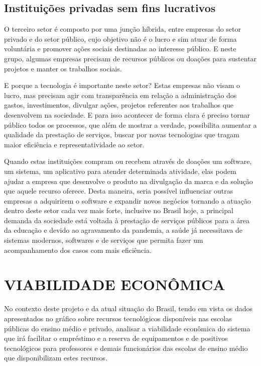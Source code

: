 \documentclass[
12pt,				%
oneside,			%
a4paper,			%
section=TITLE,
brazil,				%
]{abntex2}
\let\oldsection\section
\renewcommand\section{\clearpage\oldsection}
\begin{document}
  \subsection{Instituições privadas sem fins lucrativos}

  O terceiro setor é composto por uma junção híbrida, entre empresas do setor
  privado e do setor público, cujo objetivo não é o lucro e sim atuar de forma
  voluntária e promover ações sociais destinadas ao interesse público. E neste
  grupo, algumas empresas precisam de recursos públicos ou doações para sustentar
  projetos e manter os trabalhos sociais.

  E porque a tecnologia é importante neste setor? Estas empresas não visam o
  lucro, mas precisam agir com transparência em relação a administração dos
  gastos, investimentos, divulgar ações, projetos referentes aos trabalhos que
  desenvolvem na sociedade. E para isso acontecer de forma clara é preciso tornar
  público todos os processos, que além de mostrar a verdade, possibilita aumentar
  a qualidade da prestação de serviços, buscar por novas tecnologias que tragam
  maior eficiência e representatividade ao setor.

  Quando estas instituições compram ou recebem através de doações um software, um
  sistema, um aplicativo para atender determinada atividade, elas podem ajudar a
  empresa que desenvolve o produto na divulgação da marca e da solução que aquele
  recurso oferece.  Desta maneira, seria possível influenciar outras empresas a
  adquirirem o software e expandir novos negócios tornando a atuação dentro deste
  setor cada vez mais forte, inclusive no Brasil hoje, a principal demanda da
  sociedade está voltada à prestação de serviços públicos para a área da educação
  e devido ao agravamento da pandemia, a saúde já necessitava de sistemas
  modernos, softwares e de serviços que permita fazer um acompanhamento dos casos
  com mais eficiência.

  \section{VIABILIDADE ECONÔMICA}

  No contexto deste projeto e da atual situação do Brasil, tendo em vista os
  dados apresentados no gráfico sobre recursos tecnológicos disponíveis nas
  escolas públicas do ensino médio e privado, analisar a viabilidade econômica do
  sistema que irá facilitar o empréstimo e a reserva de equipamentos e de
  positivos tecnológicos para professores e demais funcionários das escolas de
  ensino médio que disponibilizam estes recursos.
\end{document}
